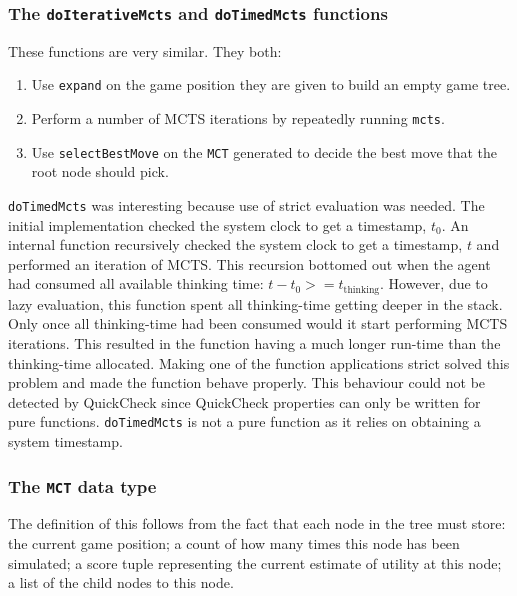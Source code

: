 \subsubsection{The \texttt{doIterativeMcts} and \texttt{doTimedMcts} functions}
These functions are very similar. They both:
\begin{enumerate}
\item[] Use \texttt{expand} on the game position they are given to build an empty game tree.
\item[] Perform a number of {MCTS} iterations by repeatedly running \texttt{mcts}.
\item[] Use \texttt{selectBestMove} on the \texttt{MCT} generated to decide the best move that the root node should pick.
\end{enumerate}
\texttt{doTimedMcts} was interesting because use of strict evaluation was needed. The initial implementation checked the system clock to get a timestamp, $t_0$. An internal function recursively checked the system clock to get a timestamp, $t$ and performed an iteration of MCTS. This recursion bottomed out when the agent had consumed all available thinking time: $t-t_0>=t_{\text{thinking}}$. However, due to lazy evaluation, this function spent all thinking-time getting deeper in the stack. Only once all thinking-time had been consumed would it start performing {MCTS} iterations. This resulted in the function having a much longer run-time than the thinking-time allocated. Making one of the function applications strict solved this problem and made the function behave properly. This behaviour could not be detected by QuickCheck since  QuickCheck properties can only be written for pure functions. \texttt{doTimedMcts} is not a pure function as it relies on obtaining a system timestamp.

\subsubsection{The \texttt{MCT} data type}
The definition of this follows from the fact that each node in the tree must store: the current game position; a count of how many times this node has been simulated; a score tuple representing the current estimate of utility at this node; a list of the child nodes to this node.

